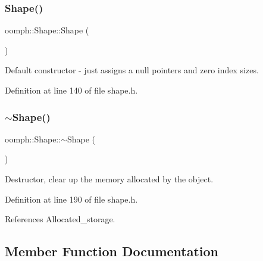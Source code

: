 \mbox{\label{classoomph_1_1Shape_af6d7a3572de5743ca382d275711a814e}} 
\subsubsection{\texorpdfstring{Shape()}{Shape()}\hspace{0.1cm}{\footnotesize\ttfamily [4/4]}}
{\footnotesize\ttfamily oomph\+::\+Shape\+::\+Shape (\begin{DoxyParamCaption}{ }\end{DoxyParamCaption})\hspace{0.3cm}{\ttfamily [inline]}}

Default constructor -\/ just assigns a null pointers and zero index sizes. 

Definition at line 140 of file shape.\+h.

\mbox{\label{classoomph_1_1Shape_af6e38eb7b8c072b0acac31c61f11cc27}} 
\subsubsection{\texorpdfstring{$\sim$\+Shape()}{~Shape()}}
{\footnotesize\ttfamily oomph\+::\+Shape\+::$\sim$\+Shape (\begin{DoxyParamCaption}{ }\end{DoxyParamCaption})\hspace{0.3cm}{\ttfamily [inline]}}



Destructor, clear up the memory allocated by the object. 



Definition at line 190 of file shape.\+h.



References Allocated\+\_\+storage.



\subsection{Member Function Documentation}
\mbox{\label{classoomph_1_1Shape_a374bd15fa30336247543459231f82af0}} 
